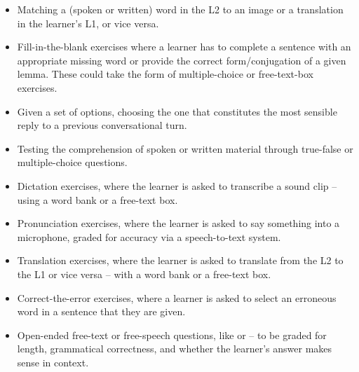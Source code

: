  \begin{itemize}
     \item Matching a (spoken or written) word in the L2 to an image or a translation in the learner's L1, or vice versa.
     \item Fill-in-the-blank exercises where a learner has to complete a sentence with an appropriate missing word or provide the correct form/conjugation of a given lemma.  These could take the form of multiple-choice or free-text-box exercises.
         \item Given a set of options, choosing the one that constitutes the most sensible reply to a previous conversational turn.
     \item Testing the comprehension of spoken or written material through true-false or multiple-choice questions.
     \item Dictation exercises, where the learner is asked to transcribe a sound clip -- using a word bank or a free-text box.
     \item Pronunciation exercises, where the learner is asked to say something into a microphone, graded for accuracy via a speech-to-text system.
     \item Translation exercises, where the learner is asked to translate from the L2 to the L1 or vice versa -- with a word bank or a free-text box.
     \item Correct-the-error exercises, where a learner is asked to select an erroneous word in a sentence that they are given.
     \item Open-ended free-text or free-speech questions, like  or  -- to be graded for length, grammatical correctness, and whether the learner's answer makes sense in context.
 \end{itemize}







